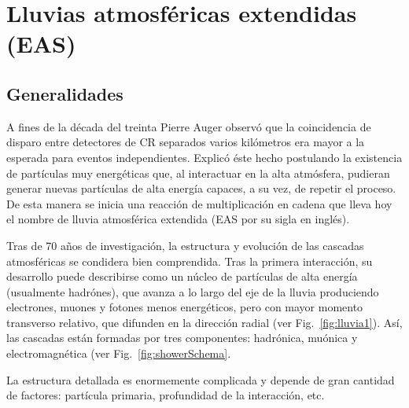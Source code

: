 \chapter{Lluvias atmosf\'ericas extendidas (EAS)}

\section{Generalidades}

A fines de la década del treinta Pierre Auger observó que la coincidencia de disparo entre detectores de CR separados varios kilómetros era mayor a la esperada para eventos independientes. Explicó éste hecho postulando la existencia de partículas muy energéticas que, al interactuar  en la alta atmósfera, pudieran generar nuevas partículas de alta energía capaces, a su vez, de repetir el proceso. De esta manera se inicia una reacción de multiplicación en cadena que lleva hoy el nombre de lluvia atmosférica extendida (EAS por su sigla en inglés). 

Tras de 70 años de investigación, la estructura y evolución de las cascadas atmosféricas se condidera bien comprendida.
Tras la primera interacción, su desarrollo puede describirse como un núcleo de partículas de alta energía (usualmente hadrónes), que avanza a lo largo del eje de la lluvia produciendo electrones, muones y fotones menos energéticos, pero con mayor momento transverso relativo, que difunden en la dirección radial (ver Fig.~\ref{fig:lluvia1}). Así, las cascadas están formadas por tres componentes: hadrónica, muónica y electromagnética (ver Fig.~\ref{fig:showerSchema}.

La estructura detallada es enormemente complicada y depende de gran cantidad de factores: partícula primaria, profundidad de la interacción, etc.

